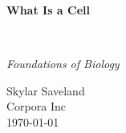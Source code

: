 \clearpage
\vspace*{1.5in}
\begin{center}
  \begin{minipage}{\textwidth}
    \centering
    \Huge\bfseries
    \linespread{1.25}\selectfont
  What Is a Cell
  \end{minipage}
  \\[3em]
  {\Large\itshape\linespread{1.3}\selectfont
  Foundations of Biology\par}
  \vfill
  {\large Skylar Saveland}
  \\[1em]
  {\large Corpora Inc}
  \\[1em]
  {\large \today}
\end{center}
\clearpage
